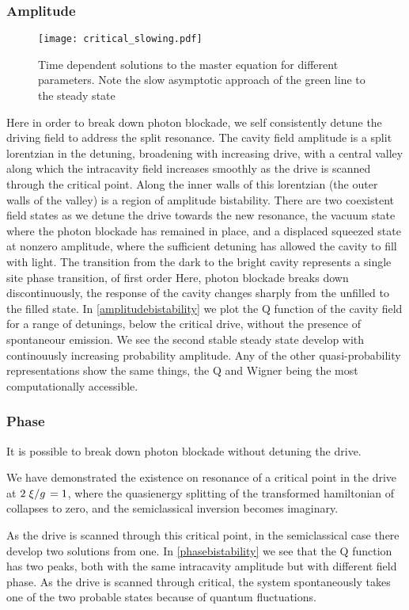 \subsubsection{Amplitude}
\begin{figure*}[bt]
  \texttt{[image: critical\_slowing.pdf]}
  \caption{Time dependent solutions to the master equation for different parameters. Note the slow asymptotic approach of the green line to the steady state}
  \label{critical_slowing}
\end{figure*}
Here in order to break down photon blockade, we self consistently detune the driving field to address the split resonance. 
The cavity field amplitude is a split lorentzian in the detuning, broadening with increasing drive, with a central valley along which the intracavity field increases smoothly as the drive is scanned through the critical point.
Along the inner walls of this lorentzian (the outer walls of the valley) is a region of amplitude bistability. 
There are two coexistent field states as we detune the drive towards the new resonance, the vacuum state where the photon blockade has remained in place, and a displaced squeezed state at nonzero amplitude, where the sufficient detuning has allowed the cavity to fill with light. 
The transition from the dark to the bright cavity represents a single site phase transition, of first order \cite{Carmichael2015}
Here, photon blockade breaks down discontinuously, the response of the cavity changes sharply from the unfilled to the filled state. 
In \cref{amplitudebistability} we plot the Q function of the cavity field for a range of detunings, below the critical drive, without the presence of spontaneour emission.
We see the second stable steady state develop with continouusly increasing probability amplitude. 
Any of the other quasi-probability representations show the same things, the Q and Wigner being the most computationally accessible. 
\subsubsection{Phase}
It is possible to break down photon blockade without detuning the drive.

We have demonstrated \cite{Carmichael2015} the existence on resonance of a critical point in the drive at $2\flatfrac{\xi}{g}=1$, where the quasienergy splitting of the transformed hamiltonian of \cite{Alsing1992} collapses to zero, and the semiclassical inversion becomes imaginary. 

As the drive is scanned through this critical point, in the semiclassical case there develop two solutions from one.
In \cref{phasebistability} we see that the Q function has two peaks, both with the same intracavity amplitude but with different field phase. 
As the drive is scanned through critical, the system spontaneously takes one of the two probable states because of quantum fluctuations. 

